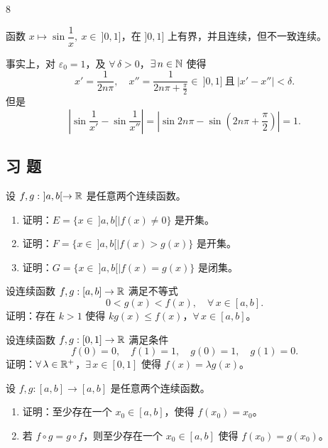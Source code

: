 \begin{sourceexample}{8}

	函数 \(x\longmapsto\sin\dfrac1x,\ x\in\ ]0,1]\)，在 \(]0,1]\) 上有界，并且连续，但不一致连续。

	事实上，对 \(\varepsilon_0=1\)，及 \(\forall\,\delta>0\)，\(\exists\,n\in\mathbb{N}\) 使得
	\[
	x'=\frac1{2n\pi},\quad x''=\frac1{2n\pi+\frac\pi2}\in\ ]0,1]\ \text{且}\ |x'-x''|<\delta.
	\]
	但是
	\[
	\left|\sin\frac1{x'}-\sin\frac1{x''}\right|=\left|\sin2n\pi-\sin\left(2n\pi+\frac\pi2\right)\right|=1.
	\]

\end{sourceexample}

\subsection*{习 题}

\begin{exercise}
	\item 设 \(f,g:\ ]a,b[\to\mathbb{R}\) 是任意两个连续函数。
	\begin{enumerate}[label=\arabic*)]
		\item 证明：\(E=\{x\in\ ]a,b[\mid f(x)\neq0\}\) 是开集。
		\item 证明：\(F=\{x\in\ ]a,b[\mid f(x)>g(x)\}\) 是开集。
		\item 证明：\(G=\{x\in\ ]a,b[\mid f(x)=g(x)\}\) 是闭集。
	\end{enumerate}
\end{exercise}

\begin{exercise}
	\item 设连续函数 \(f,g:[a,b]\to\mathbb{R}\) 满足不等式
	\[
	0<g(x)<f(x),\quad\forall\,x\in[a,b].
	\]
	证明：存在 \(k>1\) 使得 \(kg(x)\le f(x)\)，\(\forall\,x\in[a,b]\)。
\end{exercise}

\begin{exercise}
	\item 设连续函数 \(f,g:[0,1]\to\mathbb{R}\) 满足条件
	\[
	f(0)=0,\quad f(1)=1,\quad g(0)=1,\quad g(1)=0.
	\]
	证明：\(\forall\,\lambda\in\mathbb{R}^+\)，\(\exists\,x\in[0,1]\) 使得 \(f(x)=\lambda g(x)\)。
\end{exercise}

\begin{exercise}
	\item 设 \(f,g:[a,b]\to[a,b]\) 是任意两个连续函数。
	\begin{enumerate}[label=\arabic*)]
		\item 证明：至少存在一个 \(x_0\in[a,b]\)，使得 \(f(x_0)=x_0\)。
		\item 若 \(f\circ g=g\circ f\)，则至少存在一个 \(x_0\in[a,b]\) 使得 \(f(x_0)=g(x_0)\)。
	\end{enumerate}
\end{exercise}

